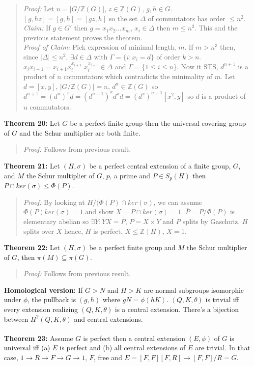 \begin{quote}
\emph{Proof:}  
Let $n=|G/{\mathbb Z}(G)|$, $z \in {\mathbb Z}(G)$, $g, h \in G$.
$[g, hz]= [g,h]= [gz, h]$ so the set $\Delta$ of commutators has order $\le n^2$.
\\
\emph{Claim:} If $g \in G'$ then $g= x_1 x_2 \ldots x_m$, $x_i \in \Delta$ then $m \le n^3$. 
This and the previous statement proves the theorem.
\\
\emph{Proof of Claim:} Pick expression of minimal length, $m$.  If $m > n^3$ then,
since $|\Delta| \le n^2$, $\exists d \in \Delta$ with $\Gamma= \{i: x_i=d \}$
of order $k > n$.
$x_i x_{i+1}= x_{i+1} x_i^{x_{i+1}}$
$x_i^{x_{i+1}} \in \Delta$ and $\Gamma= \{ 1 \le i \le n \}$.
Now it STS, $d^{n+1}$ is  a product of $n$ commutators which contradicts the minimality of
$m$.  Let $d= [x,y]$, $|G/{\mathbb Z}(G)|=n$, $d^n \in {\mathbb Z}(G)$ so
$d^{n+1}= (d^n)^x d= (d^{n-1})^x d^x d = (d^x)^{n-1} [x^2 , y]$ so $d$ is a product of $n$
 commutators.
\end{quote}
{\bf Theorem 20:}
Let $G$ be a perfect finite group then the universal covering group of $G$ and the Schur
multiplier are both finite.
\begin{quote}
\emph{Proof:}  
Follows from previous result.
\end{quote}
{\bf Theorem 21:}
Let $(H, \sigma)$ be a perfect central extension of a finite group, $G$,
and $M$ the Schur multiplier of $G$, $p$,
a prime and $P \in S_p(H)$ then $P \cap ker(\sigma) \le \Phi(P)$.
\begin{quote}
\emph{Proof:}  
By looking at $H / (\Phi(P) \cap ker( \sigma )$, we can assume $\Phi(P) ker( \sigma )=1$
and show $X= P \cap ker( \sigma ) = 1$.  ${\overline P}= P/\Phi(P)$ is elementary
abelian so $\exists {\overline Y}: {\overline Y} {\overline X}= {\overline P}$,
$P = X \times Y$ and $P$ splits by Gaschutz, $H$ splits over $X$ hence, $H$ is perfect,
$X \le {\mathbb Z}(H)$, $X=1$.
\end{quote}
{\bf Theorem 22:}
Let $(H, \sigma)$ be a perfect finite group and $M$ the Schur multiplier of $G$,
then $\pi(M) \subseteq \pi(G)$.
\begin{quote}
\emph{Proof:}  
Follows from previous result.
\end{quote}
{\bf Homological version:} If $G>N$
and $H>K$ are normal subgroups isomorphic under $\phi$, the pullback
is $(g, h)$ where $gN= \phi(hK)$.
$(Q, K, \theta)$ is trivial iff every extension realizing $(Q, K, \theta)$
is a central extension.  There's a bijection between $H^2 (Q, K, \theta)$
and central extensions. 
\\
\\
{\bf Theorem 23:}
Assume $G$ is perfect then a central extension
$(E, \phi)$ of $G$ is universal iff (a) $E$ is perfect and (b) all 
central extensions of $E$ are trivial. In that case,
$1 \rightarrow R \rightarrow F \rightarrow G \rightarrow 1$, $F$, free and
$E= [F,F][F,R] \rightarrow [F,F]/R=G$.
\begin{quote}
\end{quote}
